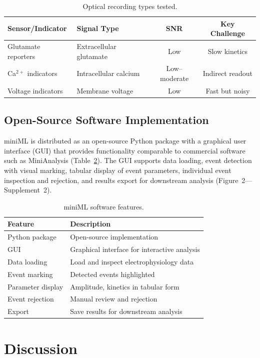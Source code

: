 \documentclass[11pt]{article}
\begin{document}
\begin{table}[H]
\centering
\caption{Optical recording types tested.}
\label{tab:optical}
\begin{tabular}{llcc}
\toprule
Sensor/Indicator & Signal Type & SNR & Key Challenge \\
\midrule
Glutamate reporters & Extracellular glutamate & Low & Slow kinetics \\
Ca$^{2+}$ indicators & Intracellular calcium & Low--moderate & Indirect readout \\
Voltage indicators & Membrane voltage & Low & Fast but noisy \\
\bottomrule
\end{tabular}
\end{table}

\subsection{Open-Source Software Implementation}

miniML is distributed as an open-source Python package with a graphical user interface (GUI) that provides functionality comparable to commercial software such as MiniAnalysis (Table~\ref{tab:software}). The GUI supports data loading, event detection with visual marking, tabular display of event parameters, individual event inspection and rejection, and results export for downstream analysis (Figure~2---Supplement~2).

\begin{table}[H]
\centering
\caption{miniML software features.}
\label{tab:software}
\begin{tabular}{ll}
\toprule
Feature & Description \\
\midrule
Python package & Open-source implementation \\
GUI & Graphical interface for interactive analysis \\
Data loading & Load and inspect electrophysiology data \\
Event marking & Detected events highlighted \\
Parameter display & Amplitude, kinetics in tabular form \\
Event rejection & Manual review and rejection \\
Export & Save results for downstream analysis \\
\bottomrule
\end{tabular}
\end{table}

\section{Discussion}
\end{document}
